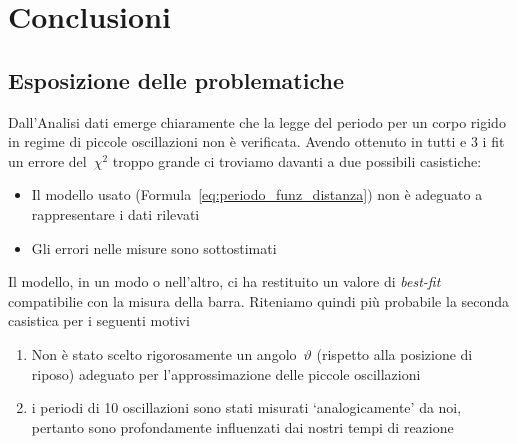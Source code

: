 \documentclass[a4paper,12pt]{article}
\begin{document}
\section{Conclusioni}
\subsection{Esposizione delle problematiche}
Dall'Analisi dati emerge chiaramente che la legge del periodo per un corpo rigido in regime di piccole oscillazioni non è verificata. Avendo ottenuto in tutti e 3 i fit un errore del~$\chi^2$ troppo grande ci troviamo davanti a due possibili casistiche:\\
\begin{itemize}
    \item Il modello usato (Formula~\ref{eq:periodo_funz_distanza}) non è adeguato a rappresentare i dati rilevati
    \item Gli errori nelle misure sono sottostimati
\end{itemize}
Il modello, in un modo o nell'altro, ci ha restituito un valore di \textit{best-fit} compatibilie con la misura della barra.
Riteniamo quindi più probabile la seconda casistica per i seguenti motivi
\begin{enumerate}
    \item Non è stato scelto rigorosamente un angolo~$\vartheta$ (rispetto alla posizione di riposo) adeguato per l'approssimazione %
    delle piccole oscillazioni
    \item i periodi di 10 oscillazioni sono stati misurati `analogicamente' da noi, pertanto sono profondamente influenzati dai nostri tempi di reazione
\end{enumerate}
\end{document}
